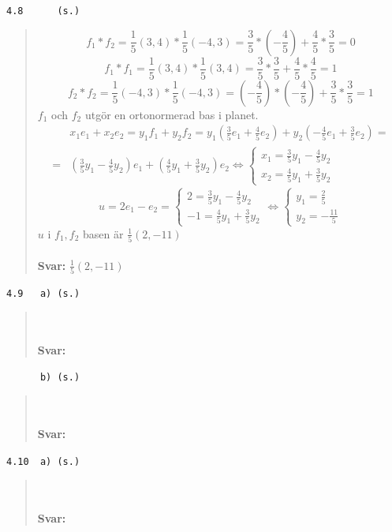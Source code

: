 \documentclass[a4paper]{article}
\newcommand{\tskcol}[1]{\textcolor{tskcol}{#1}}
\begin{document}
\texttt{\tskcol{4.8~~~~~ (s.)}}
\begin{quotation}
	\noindent
	\[f_1*f_2=\frac{1}{5}(3,4)*\frac{1}{5}(-4,3)=\frac{3}{5}*(-\frac{4}{5})+\frac{4}{5}*\frac{3}{5}=0\]
	\[f_1*f_1=\frac{1}{5}(3,4)*\frac{1}{5}(3,4)=\frac{3}{5}*\frac{3}{5}+\frac{4}{5}*\frac{4}{5}=1\]
	\[f_2*f_2=\frac{1}{5}(-4,3)*\frac{1}{5}(-4,3)=(-\frac{4}{5})*(-\frac{4}{5})+\frac{3}{5}*\frac{3}{5}=1\]
	$f_1$ och $f_2$ utgör en ortonormerad bas i planet.
	\begin{align*}
	&x_1e_1+x_2e_2=y_1f_1+y_2f_2=
	y_1(\frac{3}{5}e_1+\frac{4}{5}e_2)+y_2(-\frac{4}{5}e_1+\frac{3}{5}e_2)= \\ =
	&(\frac{3}{5}y_1-\frac{4}{5}y_2)e_1+(\frac{4}{5}y_1+\frac{3}{5}y_2)e_2 \Leftrightarrow
	\begin{cases}
	x_1=\frac{3}{5}y_1-\frac{4}{5}y_2 \\
	x_2=\frac{4}{5}y_1+\frac{3}{5}y_2
	\end{cases}
	\end{align*}
	\[u=2e_1-e_2=
	\begin{cases}
	2=\frac{3}{5}y_1-\frac{4}{5}y_2 \\
	-1=\frac{4}{5}y_1+\frac{3}{5}y_2
	\end{cases} \Leftrightarrow
	\begin{cases}
	y_1=\frac{2}{5} \\
	y_2=-\frac{11}{5}
	\end{cases}
	\]
	$u$ i $f_1,f_2$ basen är $\frac{1}{5}(2,-11)$
	\\ \\
	\textbf{Svar:} $\frac{1}{5}(2,-11)$
\end{quotation}

\texttt{\tskcol{4.9~~~a) (s.)}}
\begin{quotation}
	\noindent
	\\ \\
	\textbf{Svar:}
\end{quotation}

\texttt{\tskcol{~~~~~~b) (s.)}}
\begin{quotation}
	\noindent
	\\ \\
	\textbf{Svar:}
\end{quotation}

\texttt{\tskcol{4.10~~a) (s.)}}
\begin{quotation}
	\noindent
	\\ \\
	\textbf{Svar:}
\end{quotation}
\end{document}
